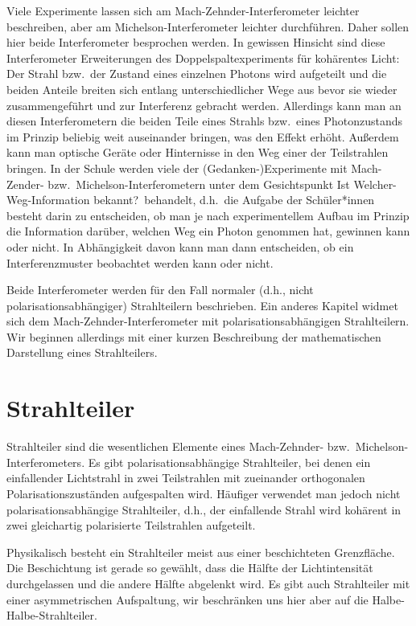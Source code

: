 Viele Experimente lassen sich am Mach-Zehnder-Interferometer leichter beschreiben,
aber am Michelson-Interferometer leichter durchf\"uhren. Daher sollen hier beide Interferometer
besprochen werden. In gewissen Hinsicht sind diese Interferometer Erweiterungen des
Doppelspaltexperiments f\"ur koh\"arentes Licht: Der Strahl bzw.\ der Zustand eines einzelnen Photons
wird aufgeteilt und die beiden Anteile breiten sich entlang unterschiedlicher Wege aus bevor
sie wieder zusammengef\"uhrt und zur Interferenz gebracht werden. Allerdings kann man an
diesen Interferometern die beiden Teile eines Strahls bzw.\ eines Photonzustands im Prinzip beliebig weit
auseinander bringen, was den Effekt erh\"oht. Au\ss erdem kann man optische
Ger\"ate oder Hinternisse in den Weg einer der Teilstrahlen bringen. In der Schule werden viele
der (Gedanken-)Experimente mit Mach-Zender- bzw.\ Michelson-Interferometern unter dem
Gesichtspunkt \glqq Ist Welcher-Weg-Information bekannt?\grqq\ behandelt, d.h.\ die Aufgabe
der Sch\"uler*innen besteht darin zu entscheiden, ob man je nach experimentellem Aufbau
im Prinzip die Information dar\"uber, welchen Weg ein Photon genommen hat, gewinnen kann
oder nicht. In Abh\"angigkeit davon kann man dann entscheiden, ob ein Interferenzmuster beobachtet werden
kann oder nicht.  

Beide Interferometer werden f\"ur den Fall normaler (d.h., nicht polarisationsabh\"angiger) 
Strahlteilern beschrieben. Ein anderes Kapitel widmet sich dem Mach-Zehnder-Interferometer 
mit polarisationsabh\"angigen Strahlteilern. Wir beginnen allerdings mit einer
kurzen Beschreibung der mathematischen Darstellung eines Strahlteilers.

\section{Strahlteiler}

Strahlteiler sind die wesentlichen 
Elemente eines Mach-Zehnder- bzw.\ Michelson-Interferometers.
Es gibt polarisationsabh\"angige Strahlteiler, bei denen ein einfallender Lichtstrahl in zwei
Teilstrahlen mit zueinander orthogonalen Polarisationszust\"anden aufgespalten wird. H\"aufiger
verwendet man jedoch nicht polarisationsabh\"angige Strahlteiler, d.h., der einfallende Strahl wird koh\"arent
in zwei gleichartig polarisierte Teilstrahlen aufgeteilt. 

Physikalisch besteht ein Strahlteiler meist aus einer beschichteten Grenzfl\"ache. Die Beschichtung ist
gerade so gew\"ahlt, dass die H\"alfte der Lichtintensit\"at durchgelassen und die andere H\"alfte
abgelenkt wird. Es gibt auch Strahlteiler mit einer asymmetrischen Aufspaltung, wir beschr\"anken uns
hier aber auf die Halbe-Halbe-Strahlteiler.

